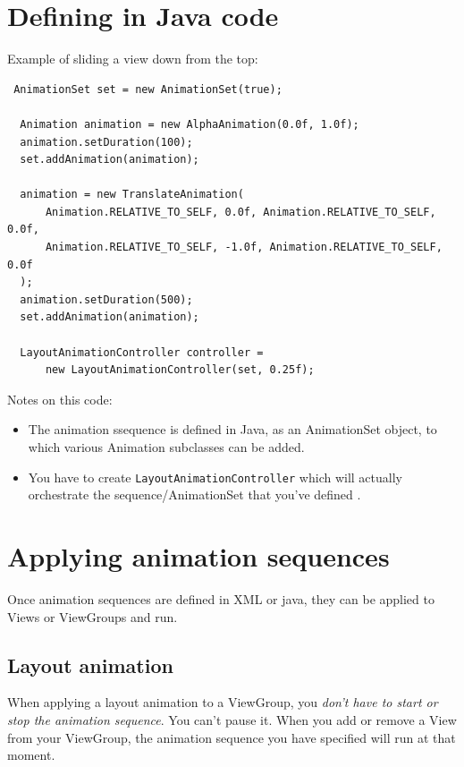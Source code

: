 \documentclass[11pt, a4paper]{book}
\begin{document}
\section{Defining in Java code}
Example of sliding a view down from the top:
\begin{verbatim}
 AnimationSet set = new AnimationSet(true);

  Animation animation = new AlphaAnimation(0.0f, 1.0f);
  animation.setDuration(100);
  set.addAnimation(animation);

  animation = new TranslateAnimation(
      Animation.RELATIVE_TO_SELF, 0.0f, Animation.RELATIVE_TO_SELF, 0.0f,
      Animation.RELATIVE_TO_SELF, -1.0f, Animation.RELATIVE_TO_SELF, 0.0f
  );
  animation.setDuration(500);
  set.addAnimation(animation);

  LayoutAnimationController controller =
      new LayoutAnimationController(set, 0.25f);
\end{verbatim}
Notes on this code:
\begin{itemize}
\item The animation ssequence is defined in Java, as an AnimationSet object, to
which various Animation subclasses can be added.
\item You have to create \verb|LayoutAnimationController| which will actually
orchestrate the sequence/AnimationSet that you've defined .
\end{itemize}
\section{Applying animation sequences}
Once animation sequences are defined in XML or java, they can be applied to
Views or ViewGroups and run.
\subsection{Layout animation}
When applying a layout animation to a ViewGroup, you \emph{don't have to start
or stop the animation sequence}. You can't pause it. When you add or remove a
View from your ViewGroup, the animation sequence you have specified will run at
that moment.
\end{document}
